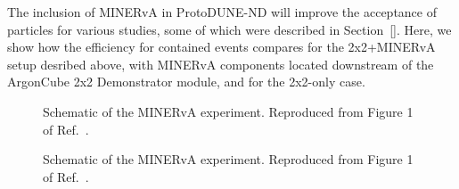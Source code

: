 The inclusion of MINERvA in ProtoDUNE-ND will improve the acceptance of particles for various studies, some of which were described in Section~\ref{}. Here, we show how the efficiency for contained events compares for the 2x2+MINERvA setup desribed above, with MINERvA components located downstream of the ArgonCube 2x2 Demonstrator module, and for the 2x2-only case.
\begin{figure}[htb]
  \centering
  \caption{Schematic of the MINERvA experiment. Reproduced from Figure 1 of Ref.~\cite{minerva-nim}.}
  \label{fig:hadronic_containment}
\end{figure}

\begin{figure}[htb]
  \centering
  \caption{Schematic of the MINERvA experiment. Reproduced from Figure 1 of Ref.~\cite{minerva-nim}.}
  \label{fig:pi0_containment}
\end{figure}

